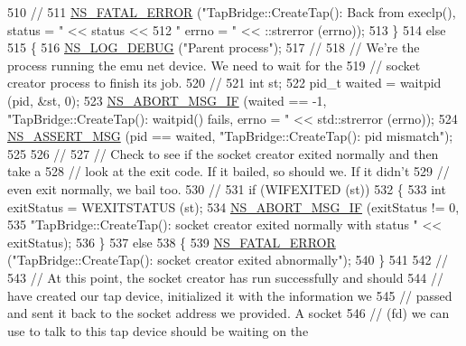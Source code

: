 \begin{DoxyCode}
510       \textcolor{comment}{//}
511       \hyperlink{group__fatal_ga5131d5e3f75d7d4cbfd706ac456fdc85}{NS\_FATAL\_ERROR} (\textcolor{stringliteral}{"TapBridge::CreateTap(): Back from execlp(), status = "} << status <<
512                       \textcolor{stringliteral}{" errno = "} << ::strerror (errno));
513     \}
514   \textcolor{keywordflow}{else}
515     \{
516       \hyperlink{group__logging_ga413f1886406d49f59a6a0a89b77b4d0a}{NS\_LOG\_DEBUG} (\textcolor{stringliteral}{"Parent process"});
517       \textcolor{comment}{//}
518       \textcolor{comment}{// We're the process running the emu net device.  We need to wait for the}
519       \textcolor{comment}{// socket creator process to finish its job.}
520       \textcolor{comment}{//}
521       \textcolor{keywordtype}{int} st;
522       pid\_t waited = waitpid (pid, &st, 0);
523       \hyperlink{group__fatal_ga6653324225bc139e46deea177614ceee}{NS\_ABORT\_MSG\_IF} (waited == -1, \textcolor{stringliteral}{"TapBridge::CreateTap(): waitpid() fails, errno = "} << 
      std::strerror (errno));
524       \hyperlink{assert_8h_aff5ece9066c74e681e74999856f08539}{NS\_ASSERT\_MSG} (pid == waited, \textcolor{stringliteral}{"TapBridge::CreateTap(): pid mismatch"});
525 
526       \textcolor{comment}{//}
527       \textcolor{comment}{// Check to see if the socket creator exited normally and then take a }
528       \textcolor{comment}{// look at the exit code.  If it bailed, so should we.  If it didn't}
529       \textcolor{comment}{// even exit normally, we bail too.}
530       \textcolor{comment}{//}
531       \textcolor{keywordflow}{if} (WIFEXITED (st))
532         \{
533           \textcolor{keywordtype}{int} exitStatus = WEXITSTATUS (st);
534           \hyperlink{group__fatal_ga6653324225bc139e46deea177614ceee}{NS\_ABORT\_MSG\_IF} (exitStatus != 0, 
535                            \textcolor{stringliteral}{"TapBridge::CreateTap(): socket creator exited normally with status "} << 
      exitStatus);
536         \}
537       \textcolor{keywordflow}{else} 
538         \{
539           \hyperlink{group__fatal_ga5131d5e3f75d7d4cbfd706ac456fdc85}{NS\_FATAL\_ERROR} (\textcolor{stringliteral}{"TapBridge::CreateTap(): socket creator exited abnormally"});
540         \}
541 
542       \textcolor{comment}{//}
543       \textcolor{comment}{// At this point, the socket creator has run successfully and should }
544       \textcolor{comment}{// have created our tap device, initialized it with the information we}
545       \textcolor{comment}{// passed and sent it back to the socket address we provided.  A socket}
546       \textcolor{comment}{// (fd) we can use to talk to this tap device should be waiting on the }

\end{DoxyCode}
